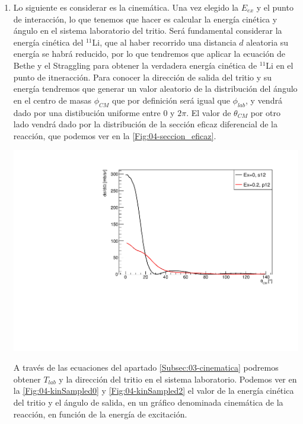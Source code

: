 \begin{enumerate}
    

    \item Lo siguiente es considerar es la cinemática. Una vez elegido la $E_{ex}$ y el punto de interacción, lo que tenemos que hacer es calcular la energía cinética y ángulo en el sistema laboratorio del tritio. Será fundamental considerar la energía cinética del $^{11}$Li, que al haber recorrido una distancia $d$ aleatoria su energía se habrá reducido, por lo que tendremos que aplicar la ecuación de Bethe y el Straggling para obtener la verdadera energía cinética de $^{11}$Li en el punto de itneracción. Para conocer la dirección de salida del tritio y su energía tendremos que generar un valor aleatorio de la distribución del ángulo en el centro de masas $\phi_{CM}$ que por definición será igual que $\phi_{lab}$, y vendrá dado por una distibución uniforme entre $0$ y $2\pi$. El valor de $\theta_{CM}$ por otro lado vendrá dado por la distribución de la sección eficaz diferencial de la reacción, que podemos ver en la \cref{Fig:04-seccion_eficaz}.
    

    \begin{center}
        \includegraphics[width=0.7\linewidth]{Imagenes/Seccion_Eficaz.pdf}
        \label{Fig:04-seccion_eficaz}
    \end{center}
    
    A través de las ecuaciones del apartado \ref{Subsec:03-cinematica} podremos obtener $T_{lab}$ y la dirección del tritio en el sistema laboratorio. Podemos ver en la \cref{Fig:04-kinSampled0} y \cref{Fig:04-kinSampled2} el valor de la energía cinética del tritio y el ángulo de salida, en un gráfico denominada cinemática de la reacción, en función de la energía de excitación.
    

\end{enumerate}
